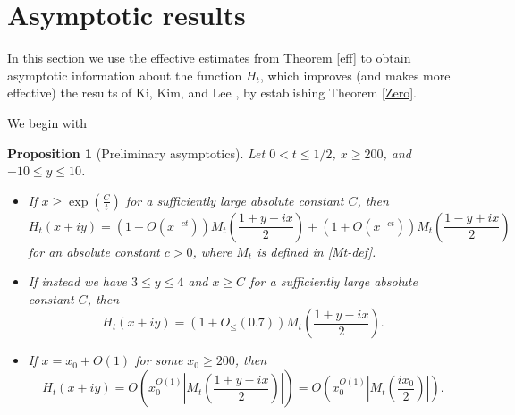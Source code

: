 \documentclass[a4paper,11pt,twoside]{amsart}
\newtheorem{proposition}[theorem]{Proposition}
\begin{document}
\section{Asymptotic results}\label{asymptotic-sec}

In this section we use the effective estimates from Theorem \ref{eff} to obtain asymptotic information about the function $H_t$, which improves (and makes more effective) the results of Ki, Kim, and Lee \cite{kkl}, by establishing Theorem \ref{Zero}.

We begin with 

\begin{proposition}[Preliminary asymptotics]\label{asymp}  Let $0 < t \leq 1/2$, $x \geq 200$, and $-10 \leq y \leq 10$.
\begin{itemize}
\item[(i)]  If $x \geq \exp(\frac{C}{t})$ for a sufficiently large absolute constant $C$, then
$$ H_t(x+iy) = (1 + O(x^{-ct})) M_t\left(\frac{1+y-ix}{2}\right) + (1 + O(x^{-ct})) M_t\left(\frac{1-y+ix}{2} \right) $$
for an absolute constant $c>0$, where $M_t$ is defined in \eqref{Mt-def}.  
\item[(ii)]  If instead we have $3 \leq y \leq 4$ and $x \geq C$ for a sufficiently large absolute constant $C$, then
$$ H_t(x+iy) = (1 + O_{\leq}(0.7)) M_t\left(\frac{1+y-ix}{2}\right).$$
\item[(iii)]  If $x = x_0 + O(1)$ for some $x_0 \geq 200$, then
$$ H_t(x+iy) = O\left( x_0^{O(1)} \left|M_t\left(\frac{1+y-ix}{2}\right)\right| \right) = O\left( x_0^{O(1)} \left|M_t\left(\frac{ix_0}{2}\right)\right| \right).$$
\end{itemize}
\end{proposition}
\end{document}
